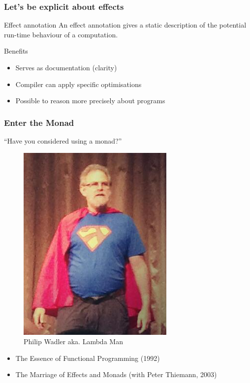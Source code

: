 \begin{frame}
  \frametitle{Let's be explicit about effects}
  \begin{block}{Effect annotation}
    An effect annotation gives a static description of the potential run-time behaviour of a computation.
  \end{block}
  Benefits
  \begin{itemize}
    \item Serves as documentation (clarity)
    \item Compiler can apply specific optimisations
    \item Possible to reason more precisely about programs
  \end{itemize}
\end{frame}

\begin{frame}
  \frametitle{Enter the Monad}
  \begin{center}
    ``Have you considered using a monad?''
    \begin{figure}
      \includegraphics[scale=0.3]{figures/lambdaman.png}
      \caption{Philip Wadler aka. Lambda Man}
    \end{figure}
  \end{center}
\begin{itemize}
  \item The Essence of Functional Programming (1992)
  \item The Marriage of Effects and Monads (with Peter Thiemann, 2003)
\end{itemize}
\end{frame}

